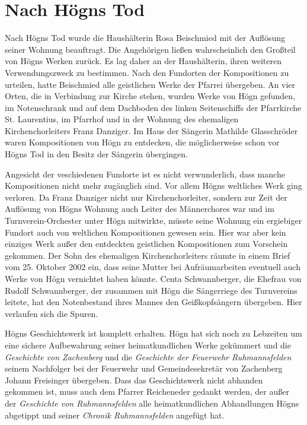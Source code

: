 \section{Nach Högns Tod}

Nach Högns Tod wurde die Haushälterin Rosa Beischmied mit der Auflösung
seiner Wohnung beauftragt. Die Angehörigen ließen wahrscheinlich den
Großteil von Högns Werken zurück. Es lag daher an der Haushälterin,
ihren weiteren Verwendungszweck zu bestimmen. Nach den Fundorten der
Kompositionen zu urteilen, hatte Beischmied alle geistlichen Werke
der Pfarrei übergeben. An vier Orten, die in Verbindung zur Kirche
stehen, wurden Werke von Högn gefunden, im Notenschrank und auf dem
Dachboden des linken Seitenschiffs der Pfarrkirche St. Laurentius, im
Pfarrhof und in der Wohnung des ehemaligen Kirchenchorleiters Franz
Danziger. Im Haus der Sängerin Mathilde Glasschröder waren
Kompositionen von Högn zu entdecken, die möglicherweise schon vor Högns
Tod in den Besitz der Sängerin übergingen.

Angesicht der veschiedenen Fundorte ist es nicht verwunderlich, dass
manche Kompositionen nicht mehr zugänglich sind. Vor allem Högns
weltliches Werk ging verloren. Da Franz Danziger nicht nur
Kirchenchorleiter, sondern zur Zeit der Auflösung von Högns Wohnung
auch Leiter des Männerchores war und im Turnverein-Orchester unter Högn
mitwirkte, müsste seine Wohnung ein ergiebiger Fundort auch von
weltlichen Kompositionen gewesen sein. Hier war aber kein einziges Werk
außer den entdeckten geistlichen Kompositionen zum Vorschein
gekommen. Der Sohn des ehemaligen Kirchenchorleiters räumte in einem
Brief vom 25. Oktober 2002 ein, dass seine Mutter bei Aufräumarbeiten
eventuell auch Werke von Högn vernichtet haben könnte. Centa
Schwannberger, die Ehefrau von Rudolf Schwannberger, der zusammen mit
Högn die Sängerriege des Turnvereins leitete, hat den Notenbestand
ihres Mannes den Geißkopfsängern übergeben. Hier verlaufen sich die
Spuren.

Högns Geschichtswerk ist komplett erhalten. Högn hat sich noch zu
Lebzeiten um eine sichere Aufbewahrung seiner heimatkundlichen Werke
gekümmert und die \textit{Geschichte von Zachenberg} und die
\textit{Geschichte der Feuerwehr Ruhmannsfelden} seinem Nachfolger
bei der Feuerwehr und Gemeindesekretär von Zachenberg Johann Freisinger
übergeben. Dass das Geschichtswerk nicht abhanden gekommen ist, muss
auch dem Pfarrer Reicheneder gedankt werden, der außer der
\textit{Geschichte von Ruhmannsfelden} alle heimatkundlichen
Abhandlungen Högns abgetippt und seiner \textit{Chronik
Ruhmannsfelden} angefügt hat.


